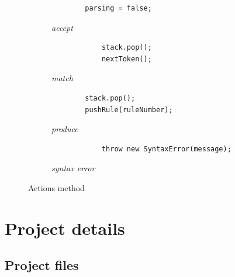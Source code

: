 \documentclass[letterpaper]{article}
\begin{document}
\begin{figure}[H]
    \begin{subfigure}{.5\textwidth}
\begin{lstlisting}
        parsing = false;
\end{lstlisting}
        \caption{\textit{accept}}
        \label{fig:acceptaction}
    \end{subfigure}
    \begin{subfigure}{.5\textwidth}
\begin{lstlisting}
            stack.pop();
            nextToken();
\end{lstlisting}
        \caption{\textit{match}}
        \label{fig:matchaction}
    \end{subfigure}
    \begin{subfigure}{.5\textwidth}
\begin{lstlisting}
        stack.pop();
        pushRule(ruleNumber);
 \end{lstlisting}
        \caption{\textit{produce}}
        \label{fig:produceaction}
    \end{subfigure}
    \begin{subfigure}{.5\textwidth}

\begin{lstlisting}
            throw new SyntaxError(message);
\end{lstlisting}
        \caption{\textit{syntax error}}
        \label{fig:syntaxerroraction}
    \end{subfigure}
    \caption{Actions method}
    \label{fig:actionsmethod}
\end{figure}

\section{Project details}

\subsection{Project files}
\end{document}
